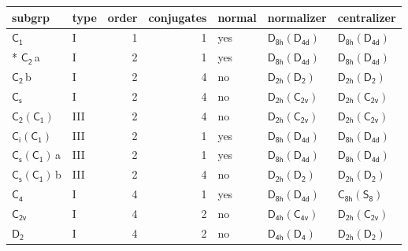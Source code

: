 \documentclass[10pt,a4paper]{article}
\numberwithin{equation}{section}
\newcommand{\grp}[1]{\mathsf{#1}}
\newcommand{\clsletter}[1]{\,{\scriptsize\color{black!55}#1}}
\begin{document}
{\small\begin{longtable}{@{}llrrlll@{}}\toprule
subgrp & type & order & conjugates & normal & normalizer & centralizer\\\midrule\endhead
\bottomrule\endfoot\endlastfoot
\href{../../../rotation/data/pdf/C1.pdf}{$\grp{C_{1}}$} & I & 1 & 1 & yes & \href{D8h-D4d.pdf}{$\grp{D_{8h}}(\grp{D_{4d}})$} & \href{D8h-D4d.pdf}{$\grp{D_{8h}}(\grp{D_{4d}})$}\\*
\href{../../../rotation/data/pdf/C2.pdf}{$\grp{C_{2}}$}\clsletter{a} & I & 2 & 1 & yes & \href{D8h-D4d.pdf}{$\grp{D_{8h}}(\grp{D_{4d}})$} & \href{D8h-D4d.pdf}{$\grp{D_{8h}}(\grp{D_{4d}})$}\\
\href{../../../rotation/data/pdf/C2.pdf}{$\grp{C_{2}}$}\clsletter{b} & I & 2 & 4 & no & \href{D2h-D2.pdf}{$\grp{D_{2h}}(\grp{D_{2}})$} & \href{D2h-D2.pdf}{$\grp{D_{2h}}(\grp{D_{2}})$}\\
\href{../../../rotation/data/pdf/C1v.pdf}{$\grp{C_{s}}$} & I & 2 & 4 & no & \href{D2h-C2v.pdf}{$\grp{D_{2h}}(\grp{C_{2v}})$} & \href{D2h-C2v.pdf}{$\grp{D_{2h}}(\grp{C_{2v}})$}\\
\href{C2-C1.pdf}{$\grp{C_{2}}(\grp{C_{1}})$} & III & 2 & 4 & no & \href{D2h-C2v.pdf}{$\grp{D_{2h}}(\grp{C_{2v}})$} & \href{D2h-C2v.pdf}{$\grp{D_{2h}}(\grp{C_{2v}})$}\\
\href{S2-C1.pdf}{$\grp{C_{i}}(\grp{C_{1}})$} & III & 2 & 1 & yes & \href{D8h-D4d.pdf}{$\grp{D_{8h}}(\grp{D_{4d}})$} & \href{D8h-D4d.pdf}{$\grp{D_{8h}}(\grp{D_{4d}})$}\\
\href{C1v-C1.pdf}{$\grp{C_{s}}(\grp{C_{1}})$}\clsletter{a} & III & 2 & 1 & yes & \href{D8h-D4d.pdf}{$\grp{D_{8h}}(\grp{D_{4d}})$} & \href{D8h-D4d.pdf}{$\grp{D_{8h}}(\grp{D_{4d}})$}\\
\href{C1v-C1.pdf}{$\grp{C_{s}}(\grp{C_{1}})$}\clsletter{b} & III & 2 & 4 & no & \href{D2h-D2.pdf}{$\grp{D_{2h}}(\grp{D_{2}})$} & \href{D2h-D2.pdf}{$\grp{D_{2h}}(\grp{D_{2}})$}\\
\href{../../../rotation/data/pdf/C4.pdf}{$\grp{C_{4}}$} & I & 4 & 1 & yes & \href{D8h-D4d.pdf}{$\grp{D_{8h}}(\grp{D_{4d}})$} & \href{C8h-S8.pdf}{$\grp{C_{8h}}(\grp{S_{8}})$}\\
\href{../../../rotation/data/pdf/C2v.pdf}{$\grp{C_{2v}}$} & I & 4 & 2 & no & \href{D4h-C4v.pdf}{$\grp{D_{4h}}(\grp{C_{4v}})$} & \href{D2h-C2v.pdf}{$\grp{D_{2h}}(\grp{C_{2v}})$}\\
\href{../../../rotation/data/pdf/D2.pdf}{$\grp{D_{2}}$} & I & 4 & 2 & no & \href{D4h-D4.pdf}{$\grp{D_{4h}}(\grp{D_{4}})$} & \href{D2h-D2.pdf}{$\grp{D_{2h}}(\grp{D_{2}})$}\\

\end{longtable}}
\end{document}
